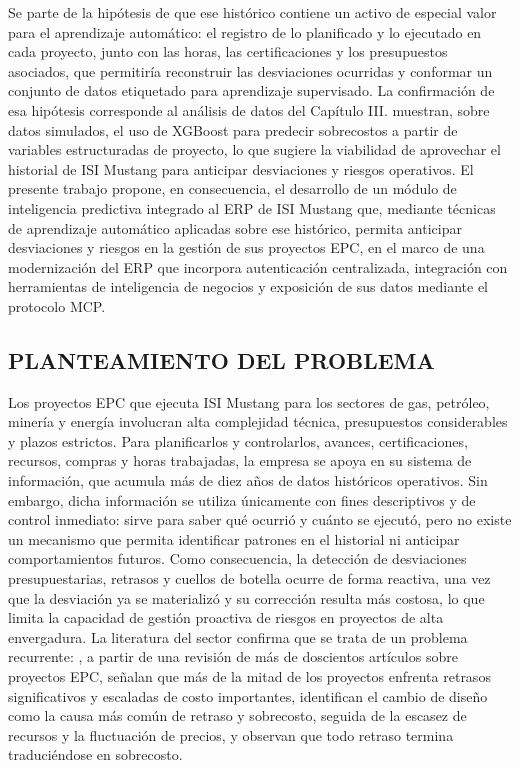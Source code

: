 Se parte de la hipótesis de que ese histórico contiene un activo de especial valor para el aprendizaje automático: el registro de lo planificado y lo ejecutado en cada proyecto, junto con las horas, las certificaciones y los presupuestos asociados, que permitiría reconstruir las desviaciones ocurridas y conformar un conjunto de datos etiquetado para aprendizaje supervisado. La confirmación de esa hipótesis corresponde al análisis de datos del Capítulo III\@. \textcite{XGBoostCostOverrun2026} muestran, sobre datos simulados, el uso de XGBoost para predecir sobrecostos a partir de variables estructuradas de proyecto, lo que sugiere la viabilidad de aprovechar el historial de ISI Mustang para anticipar desviaciones y riesgos operativos. El presente trabajo propone, en consecuencia, el desarrollo de un módulo de inteligencia predictiva integrado al ERP de ISI Mustang que, mediante técnicas de aprendizaje automático aplicadas sobre ese histórico, permita anticipar desviaciones y riesgos en la gestión de sus proyectos EPC, en el marco de una modernización del ERP que incorpora autenticación centralizada, integración con herramientas de inteligencia de negocios y exposición de sus datos mediante el protocolo MCP.

\subsection{PLANTEAMIENTO DEL PROBLEMA}

Los proyectos EPC que ejecuta ISI Mustang para los sectores de gas, petróleo, minería y energía involucran alta complejidad técnica, presupuestos considerables y plazos estrictos. Para planificarlos y controlarlos, avances, certificaciones, recursos, compras y horas trabajadas, la empresa se apoya en su sistema de información, que acumula más de diez años de datos históricos operativos. Sin embargo, dicha información se utiliza únicamente con fines descriptivos y de control inmediato: sirve para saber qué ocurrió y cuánto se ejecutó, pero no existe un mecanismo que permita identificar patrones en el historial ni anticipar comportamientos futuros. Como consecuencia, la detección de desviaciones presupuestarias, retrasos y cuellos de botella ocurre de forma reactiva, una vez que la desviación ya se materializó y su corrección resulta más costosa, lo que limita la capacidad de gestión proactiva de riesgos en proyectos de alta envergadura. La literatura del sector confirma que se trata de un problema recurrente: \textcite{EPCleadingIndicators2018}, a partir de una revisión de más de doscientos artículos sobre proyectos EPC, señalan que más de la mitad de los proyectos enfrenta retrasos significativos y escaladas de costo importantes, identifican el cambio de diseño como la causa más común de retraso y sobrecosto, seguida de la escasez de recursos y la fluctuación de precios, y observan que todo retraso termina traduciéndose en sobrecosto.

